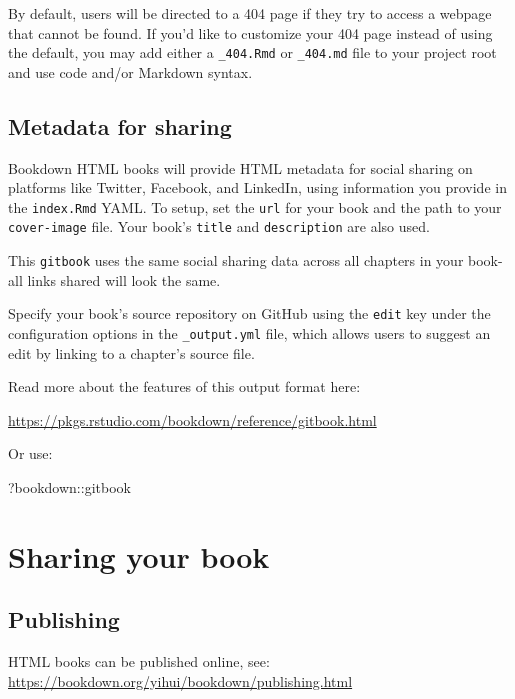 \documentclass[
]{book}
\newenvironment{Shaded}{\begin{snugshade}}{\end{snugshade}}
\newcommand{\NormalTok}[1]{#1}
\newcommand{\SpecialCharTok}[1]{\textcolor[rgb]{0.00,0.00,0.00}{#1}}
\theoremstyle{definition}
\theoremstyle{definition}
\theoremstyle{definition}
\theoremstyle{definition}
\theoremstyle{remark}
\begin{document}
By default, users will be directed to a 404 page if they try to access a webpage that cannot be found. If you'd like to customize your 404 page instead of using the default, you may add either a \texttt{\_404.Rmd} or \texttt{\_404.md} file to your project root and use code and/or Markdown syntax.

\hypertarget{metadata-for-sharing-1}{%
\section{Metadata for sharing}\label{metadata-for-sharing-1}}

Bookdown HTML books will provide HTML metadata for social sharing on platforms like Twitter, Facebook, and LinkedIn, using information you provide in the \texttt{index.Rmd} YAML. To setup, set the \texttt{url} for your book and the path to your \texttt{cover-image} file. Your book's \texttt{title} and \texttt{description} are also used.

This \texttt{gitbook} uses the same social sharing data across all chapters in your book- all links shared will look the same.

Specify your book's source repository on GitHub using the \texttt{edit} key under the configuration options in the \texttt{\_output.yml} file, which allows users to suggest an edit by linking to a chapter's source file.

Read more about the features of this output format here:

\url{https://pkgs.rstudio.com/bookdown/reference/gitbook.html}

Or use:

\begin{Shaded}
\begin{Highlighting}[]
\NormalTok{?bookdown}\SpecialCharTok{::}\NormalTok{gitbook}
\end{Highlighting}
\end{Shaded}

\hypertarget{sharing-your-book-2}{%
\chapter{Sharing your book}\label{sharing-your-book-2}}

\hypertarget{publishing-2}{%
\section{Publishing}\label{publishing-2}}

HTML books can be published online, see: \url{https://bookdown.org/yihui/bookdown/publishing.html}
\end{document}
